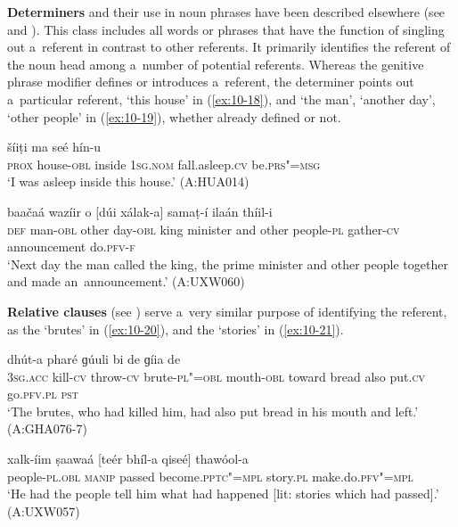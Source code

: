 \textbf{Determiners} and their use in noun phrases have been described elsewhere (see  and ). This class includes all words or phrases that have the function of singling out a~referent in contrast to other referents. It primarily identifies the referent of the noun head among a~number of potential referents. Whereas the genitive phrase modifier defines or introduces a~referent, the determiner points out a~particular referent, `this house' in (\ref{ex:10-18}), and `the man', `another day', `other people' in (\ref{ex:10-19}), whether already defined or not.

\begin{exe}
\ex
\label{ex:10-18}
 šíiṭi ma seé hín-u\\
\textsc{prox} house-\textsc{obl} inside \textsc{1sg.nom} fall.asleep.\textsc{cv} be.\textsc{prs"=msg} \\
\glt `I was asleep inside this house.' (A:HUA014)

\ex
\label{ex:10-19}
 baačaá wazíir o [dúi xálak-a] samaṭ-í ilaán thíil-i \\
\textsc{def} man-\textsc{obl} other day-\textsc{obl} king minister and other  people-\textsc{pl} gather-\textsc{cv} announcement do.\textsc{pfv-f}  \\
\glt `Next day the man called the king, the prime minister and other people together and made an~announcement.' (A:UXW060)
\end{exe}

\textbf{Relative clauses} (see ) serve a~very similar purpose of identifying the referent, as the `brutes' in (\ref{ex:10-20}), and the `stories' in (\ref{ex:10-21}).

\begin{exe}
\ex
\label{ex:10-20}
\gll [tas mheer-í ɡal-í zaalim"=aan-óom] dhút-a pharé ɡúuli bi de ɡíia de \\
\textsc{3sg.acc} kill-\textsc{cv} throw-\textsc{cv} brute-\textsc{pl"=obl} mouth-\textsc{obl} toward  bread also put.\textsc{cv} go.\textsc{pfv.pl} \textsc{pst} \\
\glt `The brutes, who had killed him, had also put bread in his mouth and left.' (A:GHA076-7)

\ex
\label{ex:10-21}
\gll xalk-íim ṣaawaá [teér bhíl-a qiseé] thawóol-a \\
people-\textsc{pl.obl} \textsc{manip} passed become.\textsc{pptc"=mpl} story.\textsc{pl} make.do.\textsc{pfv"=mpl} \\
\glt `He had the people tell him what had happened [lit: stories which had passed].' (A:UXW057)
\end{exe}

